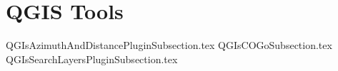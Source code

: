 

\section{QGIS Tools}

{QGIsAzimuthAndDistancePluginSubsection.tex}
{QGIsCOGoSubsection.tex}
{QGIsSearchLayersPluginSubsection.tex}


